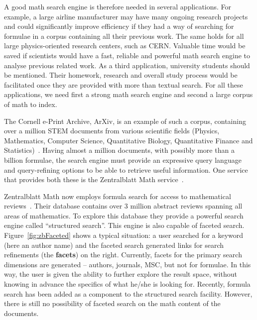 \documentclass[a4paper,oneside]{article}
\def\arxiv{\textsf{ArXiv}\xspace}
\begin{document}
A good math search engine is therefore needed in several applications.
For example, a large airline manufacturer may have many ongoing research
projects and could significantly improve efficiency if they had a way of
searching for formulae in a corpus containing all their previous work. The same
holds for all large physics-oriented research centers, such as CERN. Valuable
time would be saved if scientists would have a fast, reliable and powerful math
search engine to analyse previous related work. As a third application,
university students should be mentioned. Their homework, research and overall
study process would be facilitated once they are provided with more than
textual search. For all these applications, we need first a strong math search
engine and second a large corpus of math to index.

The Cornell e-Print Archive, \arxiv, is an example of such a corpus, containing
over a million STEM documents from various scientific fields (Physics,
Mathematics, Computer Science, Quantitative Biology, Quantitative Finance and
Statistics)~\cite{arXiv:online}. Having almost a million documents, with
possibly more than a billion formulae, the search engine must provide an
expressive query language and query-refining options to be able to retrieve
useful information. One service that provides both these is the Zentralblatt
Math service~\cite{zbmath:online}.

Zentralblatt Math now employs formula search for access to mathematical
reviews~\cite{KohMihSperTes:mfs13}. Their database contains over 3 million
abstract reviews spanning all areas of mathematics. To explore this database
they provide a powerful search engine called ``structured search''. This engine
is also capable of faceted search.  Figure~\ref{fig:zbFaceted} shows a typical
situation: a user searched for a keyword (here an author name) and the faceted
search generated links for search refinements (the \textbf{facets}) on the
right. Currently, facets for the primary search dimensions are generated --
authors, journals, MSC, but not for formulae. In this way, the user is given
the ability to further explore the result space, without knowing in advance the
specifics of what he/she is looking for.  Recently, formula search has been
added as a component to the structured search facility. However, there is still
no possibility of faceted search on the math content of the documents.
\end{document}
